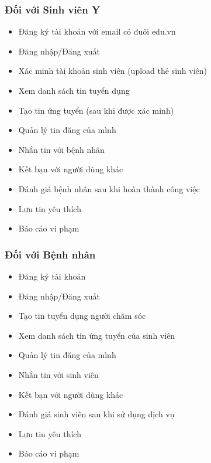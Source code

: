 \documentclass[12pt,a4paper]{report}
\begin{document}
\subsubsection{Đối với Sinh viên Y}
\begin{itemize}
    \item Đăng ký tài khoản với email có đuôi edu.vn
    \item Đăng nhập/Đăng xuất
    \item Xác minh tài khoản sinh viên (upload thẻ sinh viên)
    \item Xem danh sách tin tuyển dụng
    \item Tạo tin ứng tuyển (sau khi được xác minh)
    \item Quản lý tin đăng của mình
    \item Nhắn tin với bệnh nhân
    \item Kết bạn với người dùng khác
    \item Đánh giá bệnh nhân sau khi hoàn thành công việc
    \item Lưu tin yêu thích
    \item Báo cáo vi phạm
\end{itemize}

\subsubsection{Đối với Bệnh nhân}
\begin{itemize}
    \item Đăng ký tài khoản
    \item Đăng nhập/Đăng xuất
    \item Tạo tin tuyển dụng người chăm sóc
    \item Xem danh sách tin ứng tuyển của sinh viên
    \item Quản lý tin đăng của mình
    \item Nhắn tin với sinh viên
    \item Kết bạn với người dùng khác
    \item Đánh giá sinh viên sau khi sử dụng dịch vụ
    \item Lưu tin yêu thích
    \item Báo cáo vi phạm
\end{itemize}
\end{document}
